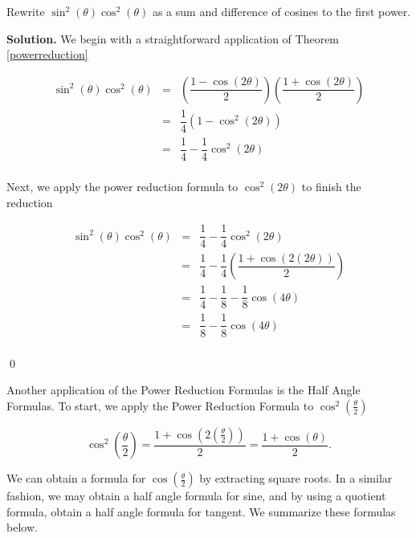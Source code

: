 \begin{ex} \label{powerreductionex} Rewrite $\sin^{2}(\theta) \cos^{2}(\theta)$ as a sum and difference of cosines to the first power.

\medskip

{\bf Solution.} We begin with a straightforward application of Theorem \ref{powerreduction}

\[ \begin{array}{rcl}

\sin^{2}(\theta) \cos^{2}(\theta) & = & \left( \dfrac{1 - \cos(2\theta)}{2} \right) \left( \dfrac{1 + \cos(2\theta)}{2} \right) \\ [10pt]
																  & = & \dfrac{1}{4}\left(1 - \cos^{2}(2\theta)\right) \\ [10pt] 
																  & = & \dfrac{1}{4} - \dfrac{1}{4}\cos^{2}(2\theta) \\ 
\end{array} \]

Next, we apply the power reduction formula to $\cos^{2}(2\theta)$ to finish the reduction

\[ \begin{array}{rcl}

\sin^{2}(\theta) \cos^{2}(\theta)  & = & \dfrac{1}{4} - \dfrac{1}{4}\cos^{2}(2\theta) \\ [10pt]
																	 & = & \dfrac{1}{4} - \dfrac{1}{4} \left(\dfrac{1 + \cos(2(2\theta))}{2}\right) \\ [10pt]
																	 & = & \dfrac{1}{4} - \dfrac{1}{8}  - \dfrac{1}{8}\cos(4\theta) \\ [10pt]
																	 & = & \dfrac{1}{8} - \dfrac{1}{8}\cos(4\theta) \\ 
\end{array} \]

\vspace{-.25in} \qed

\end{ex}

Another application of the Power Reduction Formulas is the Half Angle Formulas. To start, we apply the Power Reduction Formula to $\cos^{2}\left(\frac{\theta}{2}\right)$

\[ \cos^{2}\left(\dfrac{\theta}{2}\right) = \dfrac{1 + \cos\left(2 \left(\frac{\theta}{2}\right)\right)}{2} = \dfrac{1 + \cos(\theta)}{2}.\]

We can obtain a formula for $\cos\left(\frac{\theta}{2}\right)$ by extracting square roots.  In a similar fashion, we may obtain a half angle formula for sine, and by  using a quotient formula, obtain a half angle formula for tangent.  We summarize these formulas below.

